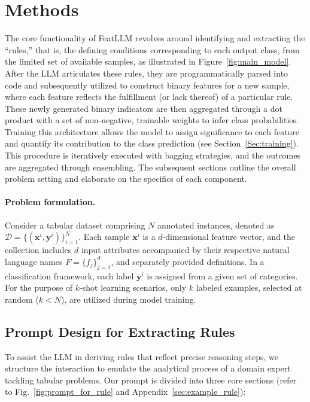 \section{Methods}
The core functionality of \textsf{FeatLLM} revolves around identifying and extracting the “rules,” that is, the defining conditions corresponding to each output class, from the limited set of available samples, as illustrated in Figure~\ref{fig:main_model}. After the LLM articulates these rules, they are programmatically parsed into code and subsequently utilized to construct binary features for a new sample, where each feature reflects the fulfillment (or lack thereof) of a particular rule. These newly generated binary indicators are then aggregated through a dot product with a set of non-negative, trainable weights to infer class probabilities. Training this architecture allows the model to assign significance to each feature and quantify its contribution to the class prediction (see Section~\ref{Sec:training}). This procedure is iteratively executed with bagging strategies, and the outcomes are aggregated through ensembling. The subsequent sections outline the overall problem setting and elaborate on the specifics of each component.

\vspace*{-0.12in}
\paragraph{Problem formulation.} Consider a tabular dataset comprising $N$ annotated instances, denoted as $\mathcal{D} = \{(\mathbf{x}^i, \mathbf{y}^i)\}_{i=1}^{N}$. Each sample $\mathbf{x}^i$ is a $d$-dimensional feature vector, and the collection includes $d$ input attributes accompanied by their respective natural language names $F = \{f_j\}_{j=1}^{d}$, and separately provided definitions. In a classification framework, each label $\mathbf{y}^i$ is assigned from a given set of categories. For the purpose of $k$-shot learning scenarios, only $k$ labeled examples, selected at random ($k<N$), are utilized during model training.

\subsection{Prompt Design for Extracting Rules}
\label{Sec:prompt_design}
To assist the LLM in deriving rules that reflect precise reasoning steps, we structure the interaction to emulate the analytical process of a domain expert tackling tabular problems. Our prompt is divided into three core sections (refer to Fig.~\ref{fig:prompt_for_rule} and Appendix~\ref{sec:example_rule}):


